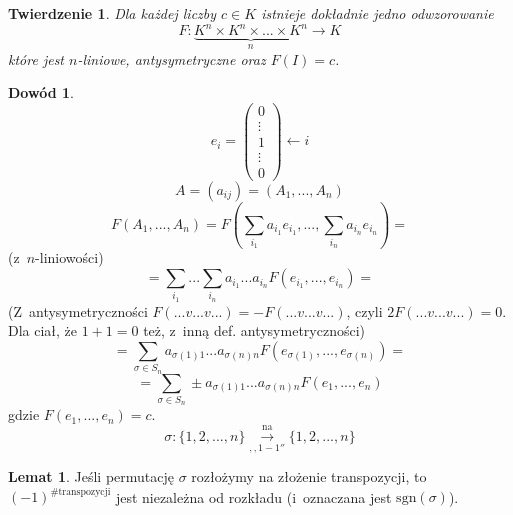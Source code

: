 \documentclass[12pt,a4paper]{article}
\theoremstyle{plain}
\newtheorem{tw}{Twierdzenie}[section]
\theoremstyle{definition}
\theoremstyle{definition}
\theoremstyle{definition}
\theoremstyle{definition}
\newtheorem*{dd}{Dowód}
\theoremstyle{definition}
\newtheorem*{lem}{Lemat}
\theoremstyle{definition}
\theoremstyle{definition}
\theoremstyle{definition}
\theoremstyle{definition}
\begin{document}
\begin{tw}
    Dla każdej liczby $c \in K$ istnieje dokładnie jedno odwzorowanie
    \[F: \underbrace{K^n \times K^n \times ... \times K^n}_{n} \rightarrow K\]
    które jest $n$-liniowe, antysymetryczne oraz $F(I) = c$.
\end{tw}

\begin{dd}
    \[e_i=\begin{pmatrix}0\\ \vdots \\1\\ \vdots \\0\end{pmatrix} \leftarrow i\]
  \[A=(a_{ij})=(A_1, ..., A_n)\]
  \[F(A_1, ..., A_n) = F(\sum_{i_1}a_{i_1}e_{i_1}, ..., \sum_{i_n}a_{i_n}e_{i_n}) =\]
  (z~$n$-liniowości)
  \[= \sum_{i_1}...\sum_{i_n}a_{i_1}...a_{i_n}F(e_{i_1}, ..., e_{i_n}) =\]
  (Z~antysymetryczności $F(...v...v...)=-F(...v...v...)$,
  czyli $2F(...v...v...)=0$. Dla ciał, że $1+1=0$ też, z~inną def. antysymetryczności)
  \[= \sum_{\sigma\in S_n}a_{\sigma(1)1}...a_{\sigma(n)n}F(e_{\sigma(1)}, ..., e_{\sigma(n)}) = \]
  \[= \sum_{\sigma\in S_n} \pm a_{\sigma(1)1}...a_{\sigma(n)n}F(e_1, ..., e_n)\]
  gdzie $F(e_1, ..., e_n)=c$.
  \[\sigma: \{1, 2, ..., n\} \overset{\mathrm{na}}{\underset{\mathrm{,,1-1''}}{\longrightarrow}} \{1, 2, ..., n\}\]

\end{dd}

\begin{lem}
    Jeśli permutację $\sigma$ rozłożymy na złożenie transpozycji, to $(-1)^{\#\mathrm{transpozycji}}$ jest niezależna od rozkładu (i~oznaczana jest $\mathrm{sgn}(\sigma)$).
\end{lem}
\end{document}
